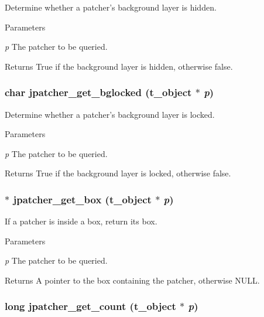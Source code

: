 Determine whether a patcher's background layer is hidden. 
\begin{DoxyParams}{Parameters}
\item[{\em p}]The patcher to be queried. \end{DoxyParams}
\begin{DoxyReturn}{Returns}
True if the background layer is hidden, otherwise false. 
\end{DoxyReturn}
\hypertarget{group__jpatcher_ga38c0179d1eb95d96f473cfde94164be4}{
\subsubsection[{jpatcher\_\-get\_\-bglocked}]{\setlength{\rightskip}{0pt plus 5cm}char jpatcher\_\-get\_\-bglocked ({\bf t\_\-object} $\ast$ {\em p})}}
\label{group__jpatcher_ga38c0179d1eb95d96f473cfde94164be4}


Determine whether a patcher's background layer is locked. 
\begin{DoxyParams}{Parameters}
\item[{\em p}]The patcher to be queried. \end{DoxyParams}
\begin{DoxyReturn}{Returns}
True if the background layer is locked, otherwise false. 
\end{DoxyReturn}
\hypertarget{group__jpatcher_gad55371f057913b8b26cb58c3c517a1f4}{
\subsubsection[{jpatcher\_\-get\_\-box}]{$\ast$ jpatcher\_\-get\_\-box ({\bf t\_\-object} $\ast$ {\em p})}}
\label{group__jpatcher_gad55371f057913b8b26cb58c3c517a1f4}


If a patcher is inside a box, return its box. 
\begin{DoxyParams}{Parameters}
\item[{\em p}]The patcher to be queried. \end{DoxyParams}
\begin{DoxyReturn}{Returns}
A pointer to the box containing the patcher, otherwise NULL. 
\end{DoxyReturn}
\hypertarget{group__jpatcher_gaf5a44f30054baae18b5019f305070612}{
\subsubsection[{jpatcher\_\-get\_\-count}]{\setlength{\rightskip}{0pt plus 5cm}long jpatcher\_\-get\_\-count ({\bf t\_\-object} $\ast$ {\em p})}}
\label{group__jpatcher_gaf5a44f30054baae18b5019f305070612}



